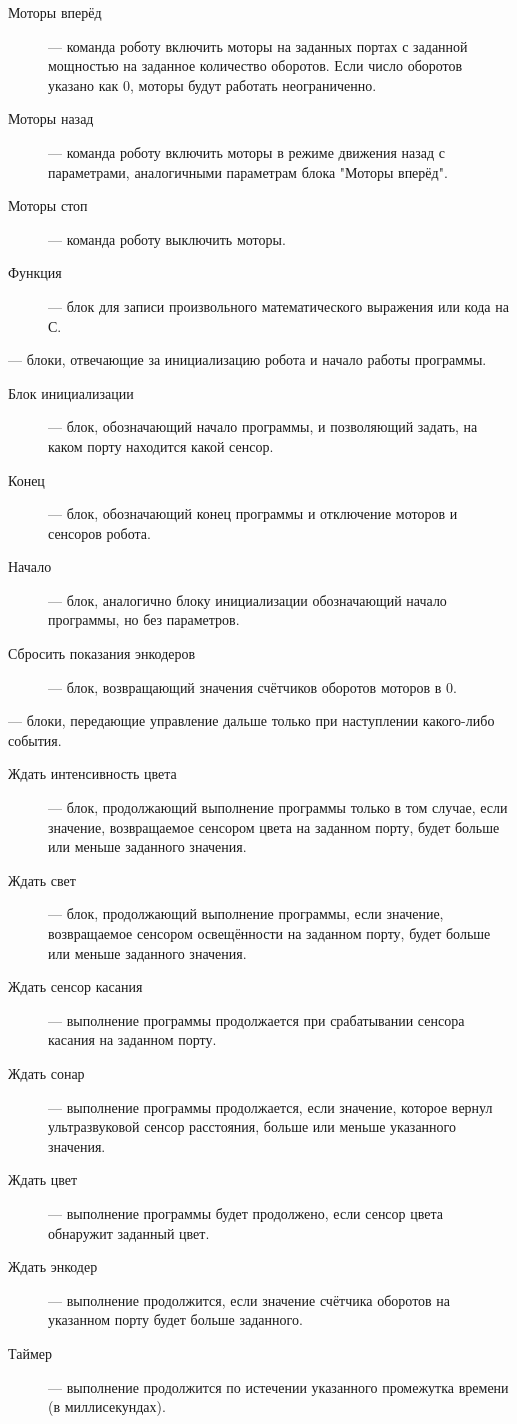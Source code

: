 \documentclass[a4paper]{article}
\begin{document}
\begin{description}
\begin{description}
    \item[Моторы вперёд] --- команда роботу включить моторы на заданных портах с заданной мощностью на заданное количество оборотов. Если число оборотов указано как 0, моторы будут работать неограниченно.
    \item[Моторы назад] --- команда роботу включить моторы в режиме движения назад с параметрами, аналогичными параметрам блока "Моторы вперёд".
    \item[Моторы стоп] --- команда роботу выключить моторы.
    \item[Функция] --- блок для записи произвольного математического выражения или кода на С.
  \end{description}
  \item[Инициализация] --- блоки, отвечающие за инициализацию робота и начало работы программы.
  \begin{description}
    \item[Блок инициализации] --- блок, обозначающий начало программы, и позволяющий задать, на каком порту находится какой сенсор.
    \item[Конец] --- блок, обозначающий конец программы и отключение моторов и сенсоров робота.
    \item[Начало] --- блок, аналогично блоку инициализации обозначающий начало программы, но без параметров.
    \item[Сбросить показания энкодеров] --- блок, возвращающий значения счётчиков оборотов моторов в 0.
  \end{description}
  \item[Ожидания] --- блоки, передающие управление дальше только при наступлении какого-либо события.
  \begin{description}
    \item[Ждать интенсивность цвета] --- блок, продолжающий выполнение программы только в том случае, если значение, возвращаемое сенсором цвета на заданном порту, будет больше или меньше заданного значения.
    \item[Ждать свет] --- блок, продолжающий выполнение программы, если значение, возвращаемое сенсором освещённости на заданном порту, будет больше или меньше заданного значения.
    \item[Ждать сенсор касания] --- выполнение программы продолжается при срабатывании сенсора касания на заданном порту.
    \item[Ждать сонар] --- выполнение программы продолжается, если значение, которое вернул ультразвуковой сенсор расстояния, больше или меньше указанного значения.
    \item[Ждать цвет] --- выполнение программы будет продолжено, если сенсор цвета обнаружит заданный цвет.
    \item[Ждать энкодер] --- выполнение продолжится, если значение счётчика оборотов на указанном порту будет больше заданного.
    \item[Таймер] --- выполнение продолжится по истечении указанного промежутка времени (в миллисекундах).
  \end{description}
\end{description}
\end{document}
